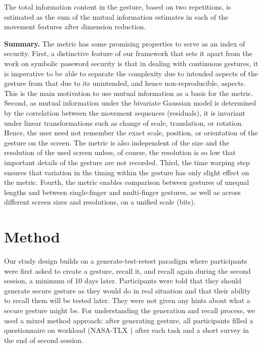 \documentclass{sig-alternate-10pt}
\begin{document}
The total information content in the gesture, based on two repetitions, is estimated as the sum of the mutual information estimates in each of the movement features after dimension reduction.


\textbf{Summary. } The metric has some promising properties to serve as an index of security. 
First, a distinctive feature of our framework that sets it apart from the work on symbolic password security is that in dealing with continuous gestures, it is imperative to be able to separate the complexity due to intended aspects of the gesture from that due to its
unintended, and hence non-reproducible, aspects. This is the
main motivation to use mutual information as a basis for the metric.
Second, as mutual information under the bivariate Gaussian model is determined by the correlation between the movement sequences (residuals), it is invariant under linear transformations such as change of scale, translation, or rotation. Hence, the user need not remember the exact scale, position, or orientation of the gesture on the screen. The metric is also independent of the size and the resolution of the used screen unless, of course, the resolution is so low that important details of the gesture are not recorded. 
Third, the time warping
step ensures that variation in the timing within the gesture has
only slight effect on the metric. Fourth, the metric enables comparison between gestures of unequal lengths and between single-finger and multi-finger gestures, as well as across different screen sizes and resolutions, on a unified scale (bits).



\section{Method}

Our study design builds on a generate-test-retest paradigm where participants were first asked to create a gesture, recall it, and recall again during the second session, a minimum of 10 days later. Participants were told that they should generate secure gesture as they would do in real situation and that their ability to recall them will be tested later. They were not given any hints about what a secure gesture might be. For understanding the generation and recall process, we used a mixed method approach: after generating gesture, all participants filled a questionnaire on workload (NASA-TLX \cite{hart:tlx}) after each task and a short survey in the end of second session.
\end{document}

